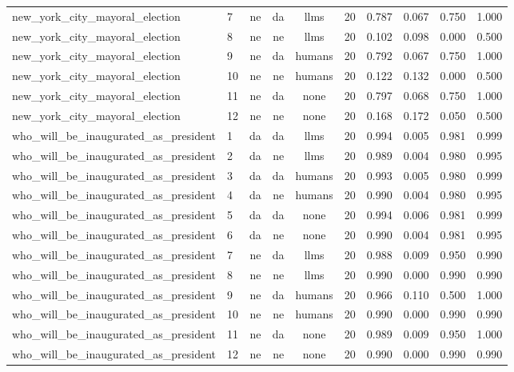 \begin{longtable}{llccclrrrr}
new\_york\_city\_mayoral\_election & 7 & ne & da & llms & 20 & 0.787 & 0.067 & 0.750 & 1.000 \\
new\_york\_city\_mayoral\_election & 8 & ne & ne & llms & 20 & 0.102 & 0.098 & 0.000 & 0.500 \\
new\_york\_city\_mayoral\_election & 9 & ne & da & humans & 20 & 0.792 & 0.067 & 0.750 & 1.000 \\
new\_york\_city\_mayoral\_election & 10 & ne & ne & humans & 20 & 0.122 & 0.132 & 0.000 & 0.500 \\
new\_york\_city\_mayoral\_election & 11 & ne & da & none & 20 & 0.797 & 0.068 & 0.750 & 1.000 \\
new\_york\_city\_mayoral\_election & 12 & ne & ne & none & 20 & 0.168 & 0.172 & 0.050 & 0.500 \\
who\_will\_be\_inaugurated\_as\_president & 1 & da & da & llms & 20 & 0.994 & 0.005 & 0.981 & 0.999 \\
who\_will\_be\_inaugurated\_as\_president & 2 & da & ne & llms & 20 & 0.989 & 0.004 & 0.980 & 0.995 \\
who\_will\_be\_inaugurated\_as\_president & 3 & da & da & humans & 20 & 0.993 & 0.005 & 0.980 & 0.999 \\
who\_will\_be\_inaugurated\_as\_president & 4 & da & ne & humans & 20 & 0.990 & 0.004 & 0.980 & 0.995 \\
who\_will\_be\_inaugurated\_as\_president & 5 & da & da & none & 20 & 0.994 & 0.006 & 0.981 & 0.999 \\
who\_will\_be\_inaugurated\_as\_president & 6 & da & ne & none & 20 & 0.990 & 0.004 & 0.981 & 0.995 \\
who\_will\_be\_inaugurated\_as\_president & 7 & ne & da & llms & 20 & 0.988 & 0.009 & 0.950 & 0.990 \\
who\_will\_be\_inaugurated\_as\_president & 8 & ne & ne & llms & 20 & 0.990 & 0.000 & 0.990 & 0.990 \\
who\_will\_be\_inaugurated\_as\_president & 9 & ne & da & humans & 20 & 0.966 & 0.110 & 0.500 & 1.000 \\
who\_will\_be\_inaugurated\_as\_president & 10 & ne & ne & humans & 20 & 0.990 & 0.000 & 0.990 & 0.990 \\
who\_will\_be\_inaugurated\_as\_president & 11 & ne & da & none & 20 & 0.989 & 0.009 & 0.950 & 1.000 \\
who\_will\_be\_inaugurated\_as\_president & 12 & ne & ne & none & 20 & 0.990 & 0.000 & 0.990 & 0.990 \\
\end{longtable}
\normalsize
